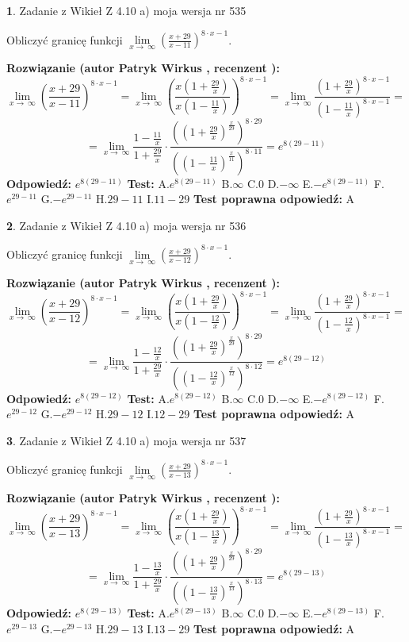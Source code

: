 \documentclass[12pt, a4paper]{article}
\theoremstyle{definition} %
\newtheorem{zad}{}
\newcommand{\zadStart}[1]{\begin{zad}#1\newline}
\newcommand{\zadStop}{\end{zad}}
\newcommand{\rozwStart}[2]{\noindent \textbf{Rozwiązanie (autor #1 , recenzent #2): }\newline}
\newcommand{\rozwStop}{\newline}
\newcommand{\odpStart}{\noindent \textbf{Odpowiedź:}\newline}
\newcommand{\odpStop}{\newline}
\newcommand{\testStart}{\noindent \textbf{Test:}\newline}
\newcommand{\testStop}{\newline}
\newcommand{\kluczStart}{\noindent \textbf{Test poprawna odpowiedź:}\newline}
\newcommand{\kluczStop}{\newline}
\begin{document}
\zadStart{Zadanie z Wikieł Z 4.10 a) moja wersja nr 535}


Obliczyć granicę funkcji  $\lim\limits_{x\to\ \infty}(\frac{x+29}{x-11})^{8\cdot x-1}$.
\zadStop
\rozwStart{Patryk Wirkus}{}
$$\lim\limits_{x\to\ \infty}(\frac{x+29}{x-11})^{8\cdot x-1} = \lim\limits_{x\to\ \infty}(\frac{x(1+\frac{29}{x})}{x(1-\frac{11}{x})})^{8\cdot x-1}=\lim\limits_{x\to\ \infty}\frac{(1+\frac{29}{x})^{8\cdot x-1}}{(1-\frac{11}{x})^{8\cdot x-1}}=$$
$$=\lim\limits_{x\to\ \infty}\frac{1-\frac{11}{x}}{1+\frac{29}{x}}\cdot\frac{((1+\frac{29}{x})^{\frac{x}{29}})^{8\cdot29}}{((1-\frac{11}{x})^{\frac{x}{11}})^{8\cdot11}}=e^{8(29-11)}$$
\rozwStop
\odpStart
$e^{8(29-11)}$
\odpStop
\testStart
A.$e^{8(29-11)}$ B.$\infty$ C.$0$ D.$-\infty$ E.$-e^{8(29-11)}$
F.$e^{29-11}$ G.$-e^{29-11}$
H.$29-11$
I.$11-29$
\testStop
\kluczStart
A
\kluczStop



\zadStart{Zadanie z Wikieł Z 4.10 a) moja wersja nr 536}


Obliczyć granicę funkcji  $\lim\limits_{x\to\ \infty}(\frac{x+29}{x-12})^{8\cdot x-1}$.
\zadStop
\rozwStart{Patryk Wirkus}{}
$$\lim\limits_{x\to\ \infty}(\frac{x+29}{x-12})^{8\cdot x-1} = \lim\limits_{x\to\ \infty}(\frac{x(1+\frac{29}{x})}{x(1-\frac{12}{x})})^{8\cdot x-1}=\lim\limits_{x\to\ \infty}\frac{(1+\frac{29}{x})^{8\cdot x-1}}{(1-\frac{12}{x})^{8\cdot x-1}}=$$
$$=\lim\limits_{x\to\ \infty}\frac{1-\frac{12}{x}}{1+\frac{29}{x}}\cdot\frac{((1+\frac{29}{x})^{\frac{x}{29}})^{8\cdot29}}{((1-\frac{12}{x})^{\frac{x}{12}})^{8\cdot12}}=e^{8(29-12)}$$
\rozwStop
\odpStart
$e^{8(29-12)}$
\odpStop
\testStart
A.$e^{8(29-12)}$ B.$\infty$ C.$0$ D.$-\infty$ E.$-e^{8(29-12)}$
F.$e^{29-12}$ G.$-e^{29-12}$
H.$29-12$
I.$12-29$
\testStop
\kluczStart
A
\kluczStop



\zadStart{Zadanie z Wikieł Z 4.10 a) moja wersja nr 537}


Obliczyć granicę funkcji  $\lim\limits_{x\to\ \infty}(\frac{x+29}{x-13})^{8\cdot x-1}$.
\zadStop
\rozwStart{Patryk Wirkus}{}
$$\lim\limits_{x\to\ \infty}(\frac{x+29}{x-13})^{8\cdot x-1} = \lim\limits_{x\to\ \infty}(\frac{x(1+\frac{29}{x})}{x(1-\frac{13}{x})})^{8\cdot x-1}=\lim\limits_{x\to\ \infty}\frac{(1+\frac{29}{x})^{8\cdot x-1}}{(1-\frac{13}{x})^{8\cdot x-1}}=$$
$$=\lim\limits_{x\to\ \infty}\frac{1-\frac{13}{x}}{1+\frac{29}{x}}\cdot\frac{((1+\frac{29}{x})^{\frac{x}{29}})^{8\cdot29}}{((1-\frac{13}{x})^{\frac{x}{13}})^{8\cdot13}}=e^{8(29-13)}$$
\rozwStop
\odpStart
$e^{8(29-13)}$
\odpStop
\testStart
A.$e^{8(29-13)}$ B.$\infty$ C.$0$ D.$-\infty$ E.$-e^{8(29-13)}$
F.$e^{29-13}$ G.$-e^{29-13}$
H.$29-13$
I.$13-29$
\testStop
\kluczStart
A
\kluczStop
\end{document}
